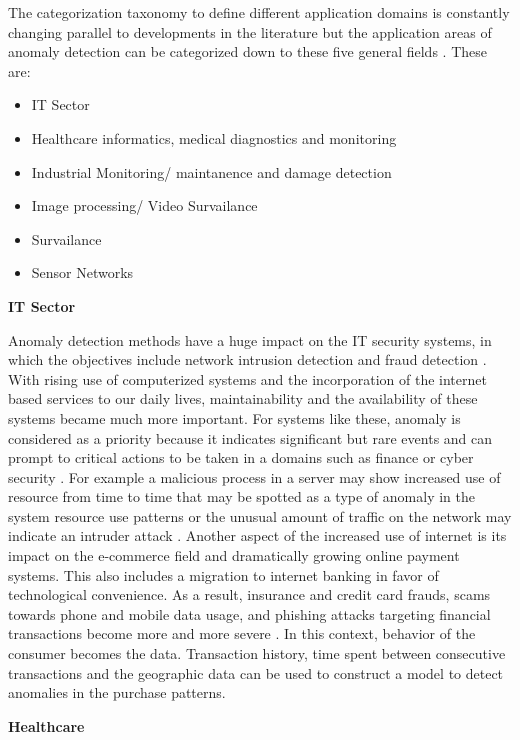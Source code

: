 {The categorization taxonomy to define different application domains is constantly changing 
parallel to developments in the literature but the application areas of 
anomaly detection can be categorized down to these five general fields
\cite{Pimentel:2014:RRN:2588908.2589196}.
These are:
\begin{itemize}
    \item IT Sector 
    \item Healthcare informatics, medical diagnostics and monitoring
    \item Industrial Monitoring/ maintanence and damage detection
    \item Image processing/ Video Survailance
    \item Survailance
    \item Sensor Networks
\end{itemize}

\textbf{ IT Sector}

Anomaly detection methods have a huge impact on the IT security systems, in which the objectives
include network intrusion detection and fraud detection \cite{Pimentel:2014:RRN:2588908.2589196}.
With rising use of computerized systems and the incorporation of the internet based services to
our daily lives, maintainability and the availability of these systems became much more important.
For systems like these, anomaly is considered as a priority because it indicates significant but
rare events and can prompt to critical actions to be taken in a domains such as finance or cyber security
\cite{AHMED201619}. For example a malicious process in a server may show increased use of resource
from time to time that may be spotted as a type of anomaly in the system resource use patterns or
the unusual amount of traffic on the network may indicate an intruder attack \cite{FERNANDES20161}
\cite{JABEZ2015338}. Another aspect of the increased use of internet is its impact on the e-commerce
field and dramatically growing online payment systems. This also includes a migration to internet
banking in favor of technological convenience. As a result, insurance and credit card frauds,
scams towards phone and mobile data usage, and phishing attacks targeting financial transactions
become more and more severe \cite{finance_anomaly}. In this context, behavior of the consumer
becomes the data. Transaction history, time spent between consecutive transactions and the
geographic data can be used to construct a model to detect anomalies in the purchase patterns.

\textbf{ Healthcare}

}
